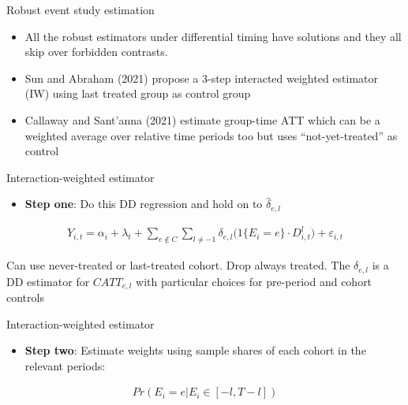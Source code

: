 \documentclass{beamer}
\begin{document}
\begin{frame}{Robust event study estimation}


\begin{itemize}
\item All the robust estimators under differential timing have solutions and they all skip over forbidden contrasts. 
\item Sun and Abraham (2021) propose a 3-step interacted weighted estimator (IW) using last treated group as control group
\item Callaway and Sant'anna (2021) estimate group-time ATT which can be a weighted average over relative time periods too but uses ``not-yet-treated'' as control
\end{itemize}

\end{frame}




\begin{frame}{Interaction-weighted estimator}

\begin{itemize}
\item \textbf{Step one}: Do this DD regression and hold on to $\widehat{\delta}_{e,l}$
\end{itemize}

\begin{eqnarray*}
Y_{i,t} = \alpha_i + \lambda_t + \sum_{e \notin C} \sum_{l \neq -1} \delta_{e,l} \big (1 \{ E_i = e \} \cdot D_{i,t}^l \big ) + \varepsilon_{i,t}
\end{eqnarray*}


\bigskip

Can use never-treated or last-treated cohort. Drop always treated. The $\delta_{e,l}$ is a DD estimator for $CATT_{e,l}$ with particular choices for pre-period and cohort controls

\end{frame}


\begin{frame}{Interaction-weighted estimator}

\begin{itemize}
\item \textbf{Step two}: Estimate weights using sample shares of each cohort in the relevant periods:
\end{itemize}

\begin{eqnarray*}
Pr(E_i=e|E_i \in [-l,T-l])
\end{eqnarray*}

\end{frame}
\end{document}
